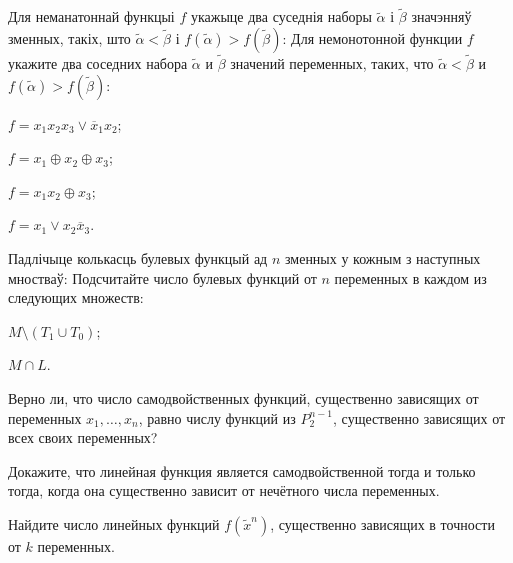 \documentclass[12pt, a4paper]{article}
\begin{document}
\begin{problemList}
\problemItemWithCommonPart
{Для неманатоннай функцыі $f$ укажыце два суседнія наборы $\tilde\alpha$ і $\tilde\beta$ значэнняў зменных,
такіх, што $\tilde\alpha < \tilde\beta$ і $f(\tilde\alpha) > f(\tilde\beta)$:}
{Для немонотонной функции $f$ укажите два соседних набора $\tilde\alpha$ и $\tilde\beta$ значений переменных,
таких, что $\tilde\alpha < \tilde\beta$ и $f(\tilde\alpha) > f(\tilde\beta)$:}
{%
\begin{belarusianEnumerateTwocol}
    \item $f=x_1x_2x_3\vee \overline{x}_1x_2$;
    \item $f=x_1\oplus x_2\oplus x_3$;
    \item $f=x_1x_2\oplus x_3$;
    \item $f=x_1\vee x_2\overline{x}_3$.
\end{belarusianEnumerateTwocol}
}

\smallskip

\problemItemWithCommonPart
{Падлічыце колькасць булевых функцый ад $n$ зменных у кожным з наступных мностваў:}
{Подсчитайте число булевых функций от $n$ переменных в каждом из следующих множеств:}
{%
\begin{belarusianEnumerateTwocol}
    \item $M\setminus(T_1 \cup T_0)$;
    \item $M \cap L$.
\end{belarusianEnumerateTwocol}
}

\smallskip

{Верно ли, что число самодвойственных функций, существенно зависящих от переменных $x_1, \ldots, x_n$,
равно числу функций из $P_2^{n-1}$, существенно зависящих от всех своих переменных?}

\bigskip

{Докажите, что линейная функция является самодвойственной тогда и только тогда,
когда она существенно зависит от нечётного числа переменных.}

\bigskip

{Найдите число линейных функций $f(\tilde x^n)$, существенно зависящих в точности от $k$ переменных.}


\end{problemList}
\end{document}
